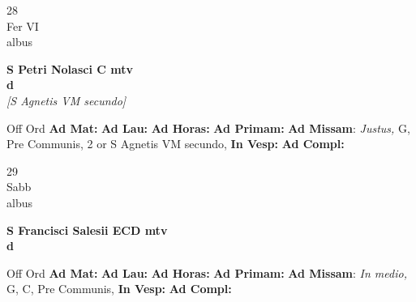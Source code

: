 \documentclass[10pt, openany]{book}
\begin{document}
    \begin{center}
        \begin{minipage}{3.5in}
            \vspace{2em}
            \begin{minipage}{0.5in}
                {\Huge 28} \\
                {\normalsize Fer VI} \\
                {\normalsize albus}
            \end{minipage}
            \begin{minipage}{3.0in}
                \textbf{ \large S Petri Nolasci C mtv \\
                \textnormal{\normalsize d}} \\ \textit{[S Agnetis VM secundo]} \\ 
            \end{minipage}
            \begin{justify}Off Ord
                \textbf{Ad Mat: }
                \textbf{Ad Lau: }
                \textbf{Ad Horas: }
                \textbf{Ad Primam: }\textbf{Ad Missam}: \textit{Justus,} G, Pre Communis, 2 or S Agnetis VM secundo,  
                \textbf{In Vesp: }
                \textbf{Ad Compl: }
            \end{justify}
        \end{minipage}
    \end{center}

    \begin{center}
        \begin{minipage}{3.5in}
            \vspace{2em}
            \begin{minipage}{0.5in}
                {\Huge 29} \\
                {\normalsize Sabb} \\
                {\normalsize albus}
            \end{minipage}
            \begin{minipage}{3.0in}
                \textbf{ \large S Francisci Salesii ECD mtv \\
                \textnormal{\normalsize d}} \\ 
            \end{minipage}
            \begin{justify}Off Ord
                \textbf{Ad Mat: }
                \textbf{Ad Lau: }
                \textbf{Ad Horas: }
                \textbf{Ad Primam: }\textbf{Ad Missam}: \textit{In medio,} G, C, Pre Communis,  
                \textbf{In Vesp: }
                \textbf{Ad Compl: }
            \end{justify}
        \end{minipage}
    \end{center}
\end{document}
